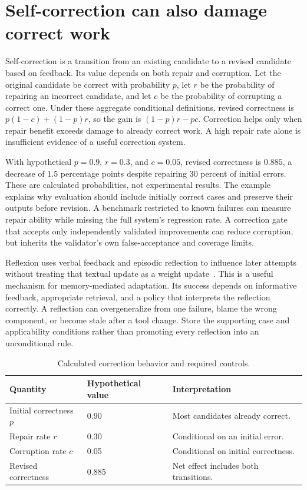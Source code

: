 \section{Self-correction can also damage correct work}
\label{sec:C10:correction}
Self-correction is a transition from an existing candidate to a revised candidate based on feedback. Its value depends on both repair and corruption. Let the original candidate be correct with probability $p$, let $r$ be the probability of repairing an incorrect candidate, and let $c$ be the probability of corrupting a correct one. Under these aggregate conditional definitions, revised correctness is $p(1-c)+(1-p)r$, so the gain is $(1-p)r-pc$. Correction helps only when repair benefit exceeds damage to already correct work. A high repair rate alone is insufficient evidence of a useful correction system.

With hypothetical $p=0.9$, $r=0.3$, and $c=0.05$, revised correctness is $0.885$, a decrease of 1.5 percentage points despite repairing 30 percent of initial errors. These are calculated probabilities, not experimental results. The example explains why evaluation should include initially correct cases and preserve their outputs before revision. A benchmark restricted to known failures can measure repair ability while missing the full system's regression rate. A correction gate that accepts only independently validated improvements can reduce corruption, but inherits the validator's own false-acceptance and coverage limits.

Reflexion uses verbal feedback and episodic reflection to influence later attempts without treating that textual update as a weight update~\cite{shinn2023reflexion}. This is a useful mechanism for memory-mediated adaptation. Its success depends on informative feedback, appropriate retrieval, and a policy that interprets the reflection correctly. A reflection can overgeneralize from one failure, blame the wrong component, or become stale after a tool change. Store the supporting case and applicability conditions rather than promoting every reflection into an unconditional rule.

{\small\setlength{\tabcolsep}{3pt}
\begin{table}[!htbp]
\centering
\caption{Calculated correction behavior and required controls.}\label{tab:C10:correction}
\begin{tabular}{L{29mm}L{37mm}L{40mm}}

\toprule Quantity & Hypothetical value & Interpretation\\\midrule
Initial correctness $p$ & 0.90 & Most candidates already correct.\\
Repair rate $r$ & 0.30 & Conditional on an initial error.\\
Corruption rate $c$ & 0.05 & Conditional on initial correctness.\\
Revised correctness & 0.885 & Net effect includes both transitions.\\
\bottomrule
\end{tabular}
\end{table}
}

